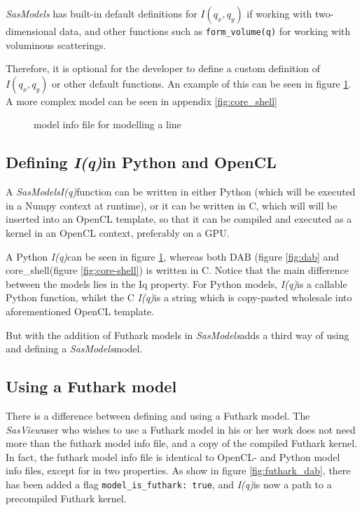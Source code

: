 \documentclass[11pt]{article}
\newcommand{\sasmodels}{\textit{SasModels}}
\newcommand{\sasview}{\textit{SasView}}
\newcommand{\iq}{\textit{I(q)}}
\begin{document}
\sasmodels{} has built-in default definitions for $I(q_x,q_y)$ if working
with two-dimensional data, and other functions such as \texttt{form\_volume(q)}
for working with voluminous scatterings.

Therefore, it is optional for the developer to define a custom definition
of $I(q_x, q_y)$ or other default functions.
An example of this can be seen in figure \ref{fig:linemodel}.
A more complex model can be seen in appendix \ref{fig:core_shell}

\begin{figure}
  \caption{model info file for modelling a line}\label{fig:linemodel}
\end{figure}

\subsection{Defining \iq in Python and OpenCL}
A \sasmodels \iq function can be written in either Python (which will be
executed in a Numpy context at runtime), or it can be written in C, which will
will be inserted into an OpenCL template, so that it can be compiled and 
executed as a kernel in an OpenCL context, preferably on a GPU.

A Python \iq can be seen in figure \ref{fig:linemodel}, whereas both DAB (figure
\ref{fig:dab} and core\_shell(figure \ref{fig:core-shell}) is written in C.
Notice that the main difference between the models lies in the Iq property.
For Python models, \iq is a callable Python function, whilst the C \iq is a
 string which is copy-pasted wholesale into aforementioned OpenCL template.

But with the addition of Futhark models in \sasmodels adds a third way of
using and defining a \sasmodels model.

\subsection{Using a Futhark model}
\label{sec:using-futhark}
There is a difference between defining and using a Futhark model.
The \sasview user who wishes to use a Futhark model in his or her work does 
not need more than the futhark model info file, and a copy of the compiled
Futhark kernel. In fact, the futhark model info file is identical to OpenCL- 
and Python model info files, except for in two properties.
As show in figure \ref{fig:futhark_dab}, there has been added a flag 
\texttt{model\_is\_futhark: true}, and \iq is now a path to a precompiled 
Futhark kernel.
\end{document}

